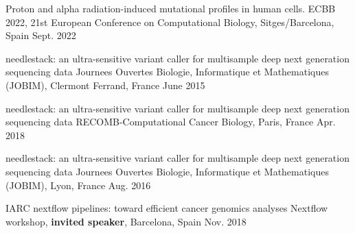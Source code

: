 \begin{cventries}
 
  \cvpublicationentry
    {} %
    {Proton and alpha radiation-induced mutational profiles in human cells.} %
    {ECBB 2022, 21st European Conference
on Computational Biology, Sitges/Barcelona, Spain} %
    {}
    {Sept. 2022} %
    {} %

  \cvpublicationentry
    {} %
    {needlestack: an ultra-sensitive variant caller for multi­sample deep next
generation sequencing data} %
    {Journees Ouvertes Biologie, Informatique et Mathematiques (JOBIM), Clermont Ferrand, France} %
    {}
    {June 2015} %
    {} %

  \cvpublicationentry
    {} %
    {needlestack: an ultra-sensitive variant caller for multi­sample deep next
generation sequencing data} %
    {RECOMB-Computational Cancer Biology, Paris, France} %
    {}
    {Apr. 2018} %
    {} %

 
  \cvpublicationentry
    {} %
    {needlestack: an ultra-sensitive variant caller for multi­sample deep next
generation sequencing data} %
    {Journees Ouvertes Biologie, Informatique et Mathematiques (JOBIM), Lyon, France} %
    {}
    {Aug. 2016} %
    {} %

  \cvpublicationentry
    {} %
    {IARC nextflow pipelines: toward efficient cancer genomics analyses} %
    {Nextflow workshop, \textbf{invited speaker}, Barcelona, Spain} %
    {}
    {Nov. 2018} %
    {} %

\end{cventries}
